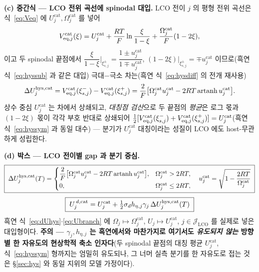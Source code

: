 \textbf{(c) 중간식 --- LCO 전위 곡선에 spinodal 대입.}
LCO 전이 $j$ 의 평형 전위 곡선은 식~\eqref{eq:Veq} 에 $U_j^\mathrm{cat},\Omega_j^\mathrm{cat}$ 를 넣어
\begin{equation}
V_{\mathrm{eq},j}^\mathrm{cat}(\xi)=U_j^\mathrm{cat}
+\frac{RT}{F}\ln\frac{\xi}{1-\xi}+\frac{\Omega_j^\mathrm{cat}}{F}(1-2\xi),
\label{eq:lco-Veq}
\end{equation}
이고 두 spinodal 끝점에서 $\dfrac{\xi}{1-\xi}\Big|_{\xi_{s,j}^\pm}=\dfrac{1\pm u_j^\mathrm{cat}}{1\mp
u_j^\mathrm{cat}}$, $(1-2\xi)\big|_{\xi_{s,j}^\pm}=\mp u_j^\mathrm{cat}$ 이므로(흑연 식~\eqref{eq:hyssub}
과 같은 대입) 극대$-$극소 차는(흑연 식~\eqref{eq:hysdiff} 의 전개 재사용)
\[
\Delta U_{j}^{\mathrm{hys},\mathrm{cat}}=V_{\mathrm{eq},j}^\mathrm{cat}(\xi_{s,j}^-)-V_{\mathrm{eq},j}^\mathrm{cat}(\xi_{s,j}^+)
=\frac{2}{F}\big[\Omega_j^\mathrm{cat}u_j^\mathrm{cat}-2RT\,\mathrm{artanh}\,u_j^\mathrm{cat}\big].
\]
상수 중심 $U_j^\mathrm{cat}$ 는 차에서 상쇄되고, \emph{대칭점 검산}으로 두 끝점의 \emph{평균}은 로그 몫과
$(1-2\xi)$ 몫이 각각 부호 반대로 상쇄되어 $\tfrac12[V_{\mathrm{eq},j}^\mathrm{cat}(\xi_{s,j}^-)
+V_{\mathrm{eq},j}^\mathrm{cat}(\xi_{s,j}^+)]=U_j^\mathrm{cat}$(흑연 식~\eqref{eq:hyssym} 과 동일 대수) ---
분기가 $U_j^\mathrm{cat}$ 대칭이라는 성질이 LCO 에도 host-무관하게 성립한다.

\textbf{(d) 박스 --- LCO 전이별 gap 과 분기 중심.}
\begin{equation}
\boxed{\;
\Delta U_j^{\mathrm{hys},\mathrm{cat}}(T)=
\begin{cases}
\dfrac{2}{F}\big[\Omega_j^\mathrm{cat}u_j^\mathrm{cat}-2RT\,\mathrm{artanh}\,u_j^\mathrm{cat}\big],
& \Omega_j^\mathrm{cat}>2RT,\\[4pt]
0, & \Omega_j^\mathrm{cat}\le2RT,
\end{cases}
\quad u_j^\mathrm{cat}=\sqrt{1-\dfrac{2RT}{\Omega_j^\mathrm{cat}}}\;}
\label{eq:lco-dUhys}
\end{equation}
\begin{equation}
\boxed{\;
U_j^{\,d,\mathrm{cat}}=U_j^\mathrm{cat}
+\tfrac12\sigma_d h_{\eta,j}\gamma_j\,\Delta U_j^{\mathrm{hys},\mathrm{cat}}(T)\;}
\label{eq:lco-Ubranch}
\end{equation}
흑연 식~\eqref{eq:dUhys}$\cdot$\eqref{eq:Ubranch} 에 $\Omega_j\mapsto\Omega_j^\mathrm{cat}$,
$U_j\mapsto U_j^\mathrm{cat}$, $j\in\mathcal J_\mathrm{LCO}$ 를 실제로 넣은 대입형이다. \textbf{주의 --- $\gamma_j,h_{\eta,j}$ 는 흑연에서와 마찬가지로 여기서도
\emph{유도되지 않는} 방향별 한 자유도의 현상학적 축소 인자다}(두 spinodal 끝점의 대칭 평균
$U_j^\mathrm{cat}$, 식~\eqref{eq:hyssym} 형까지는 엄밀히 유도되나, 그 너머 실측 분기를 한 자유도로 접는
것은 \S\ref{sec:hys} 와 동일 지위의 모델 가정이다).

